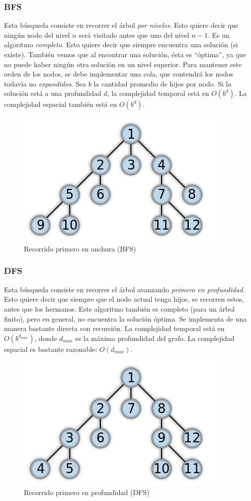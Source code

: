 \documentclass[11pt,a4paper]{article}
\begin{document}
\subsubsection{BFS}
Esta búsqueda consiste en recorrer el árbol \emph{por niveles}. Esto quiere decir que ningún nodo del nivel $n$ será visitado antes que uno del nivel $n-1$.
Es un algoritmo \emph{completo}. Esto quiere decir que siempre encuentra una solución (si existe). También vemos que al encontrar una solución, ésta es ``óptima'', ya que no puede haber ningún otra solución en un nivel superior.
Para mantener este orden de los nodos, se debe implementar una cola, que contendrá los nodos todavia no \emph{expandidos}.
Sea $b$ la cantidad promedio de hijos por nodo. Si la solución está a una profundidad $d$, la complejidad temporal está en $O(b^d)$. La complejidad espacial también está en $O(b^d)$.
{
\begin{figure}
  \centering
    \includegraphics{img/BFS}
  \caption{Recorrido primero en anchura (BFS)}
  \label{fig:BFS}
\end{figure}
}
\subsubsection{DFS}
Esta búsqueda consiste en recorrer el árbol avanzando \emph{primero en profundidad}. Esto quiere decir que siempre que el nodo actual tenga hijos, se recorren estos, antes que los hermanos.
Este algoritmo también es completo (para un árbol finito), pero en general, no encuentra la solución óptima. Se implementa de una manera bastante directa con recursión. La complejidad temporal está en $O(b^{d_{max}})$, donde $d_{max}$ es la máxima profundidad del grafo. La complejidad espacial es bastante razonable: $O(d_{max})$.

{
\begin{figure}
  \centering
    \includegraphics{img/DFS}
  \caption{Recorrido primero en profundidad (DFS)}
  \label{fig:DFS}
\end{figure}
}
\end{document}
